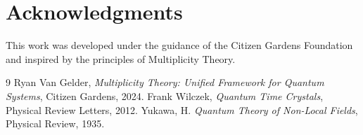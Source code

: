 \documentclass{article}
\theoremstyle{plain}
\begin{document}
\section*{Acknowledgments}
This work was developed under the guidance of the Citizen Gardens Foundation and inspired by the principles of Multiplicity Theory.


\begin{thebibliography}{9}
 Ryan Van Gelder, \emph{Multiplicity Theory: Unified Framework for Quantum Systems}, Citizen Gardens, 2024.
 Frank Wilczek, \emph{Quantum Time Crystals}, Physical Review Letters, 2012.
 Yukawa, H. \emph{Quantum Theory of Non-Local Fields}, Physical Review, 1935.
\end{thebibliography}
\end{document}
